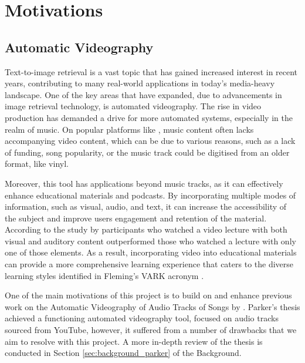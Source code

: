 \documentclass{l4proj}
\begin{document}
\section{Motivations}
\subsection{Automatic Videography}
Text-to-image retrieval is a vast topic that has gained increased interest in recent years, contributing to many real-world applications in today's media-heavy landscape. One of the key areas that have expanded, due to  advancements in image retrieval technology, is automated videography. The rise in video production \citep{rise_video} has demanded a drive for more automated systems, especially in the realm of music. On popular platforms like \cite{youtube}, music content often lacks accompanying video content, which can be due to various reasons, such as a lack of funding, song popularity, or the music track could be digitised from an older format, like vinyl. 

Moreover, this tool has applications beyond music tracks, as it can effectively enhance educational materials and podcasts. By incorporating multiple modes of information, such as visual, audio, and text, it can increase the accessibility of the subject and improve users engagement and retention of the material. According to the study by \citep{benefits_of_mmv} participants who watched a video lecture with both visual and auditory content outperformed those who watched a lecture with only one of those elements. As a result, incorporating video into educational materials can provide a more comprehensive learning experience that caters to the diverse learning styles identified in Fleming's VARK acronym \citep{vark}.

One of the main motivations of this project is to build on and enhance previous work on the Automatic Videography of Audio Tracks of Songs by \cite{Parker}. Parker's thesis achieved a functioning automated videography tool, focused on audio tracks sourced from YouTube, however, it suffered from a number of drawbacks that we aim to resolve with this project. A more in-depth review of the thesis is conducted in Section \ref{sec:background_parker} of the Background.
\end{document}
